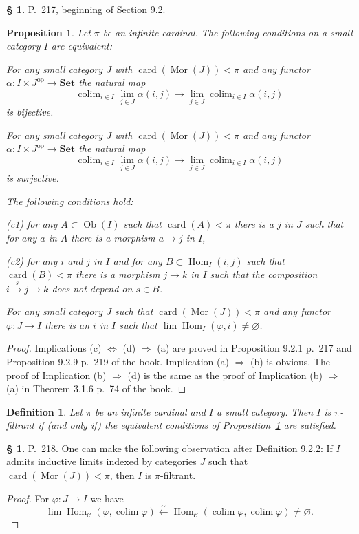 \documentclass[12pt]{article}%
\newtheorem{prop}[thm]{Proposition}
\newtheorem{df}[thm]{Definition}%
\theoremstyle{remark}
\theoremstyle{definition}
\newtheorem{s}[thm]{\S}%
\newcommand{\nn}{\noindent}
\newcommand{\C}{\mathcal C}
\newcommand{\Set}{\mathbf{Set}}%
\newcommand{\pp}{\varphi}
\newcommand{\ssi}{\Leftrightarrow}%
\newcommand{\then}{\Rightarrow}
\newcommand{\xr}{\xrightarrow}
\DeclareMathOperator*{\colim}{colim}%
\DeclareMathOperator{\card}{card}%
\DeclareMathOperator{\Hom}{Hom}%
\DeclareMathOperator{\Mor}{Mor}
\DeclareMathOperator{\Ob}{Ob}
\DeclareMathOperator{\op}{op}
\begin{document}
\begin{s}
P.~217, beginning of Section 9.2. 

\begin{prop}\label{ppifil}
Let $\pi$ be an infinite cardinal. The following conditions on a small category $I$ are equivalent:

\nn{\em(a)} For any small category $J$ with $\card(\Mor(J))<\pi$ and any functor $\alpha:I\times J^{\op}\to\Set$ the natural map 
$$
\colim_{i\in I}\lim_{j\in J}\alpha(i,j)\to\lim_{j\in J}\colim_{i\in I}\alpha(i,j)
$$ 
is bijective.

\nn{\em(b)} For any small category $J$ with $\card(\Mor(J))<\pi$ and any functor $\alpha:I\times J^{\op}\to\Set$ the natural map 
$$
\colim_{i\in I}\lim_{j\in J}\alpha(i,j)\to\lim_{j\in J}\colim_{i\in I}\alpha(i,j)
$$ 
is surjective.

\nn{\em(c)} The following conditions hold:

{\em(c1)} for any $A\subset\Ob(I)$ such that $\card(A)<\pi$ there is a $j$ in $J$ such that for any $a$ in $A$ there is a morphism $a\to j$ in $I$,

{\em(c2)} for any $i$ and $j$ in $I$ and for any $B\subset\Hom_I(i,j)$ such that $\card(B)<\pi$ there is a morphism $j\to k$ in $I$ such that the composition $i\xr sj\to k$ does not depend on $s\in B$.

\nn{\em(d)} For any small category $J$ such that $\card(\Mor(J))<\pi$ and any functor $\pp:J\to I$ there is an $i$ in $I$ such that $\lim\Hom_I(\pp,i)\neq\varnothing$. 
\end{prop}

\begin{proof}
Implications (c) $\ssi$ (d) $\then$ (a) are proved in Proposition 9.2.1 p.~217 and Proposition 9.2.9 p.~219 of the book. Implication (a) $\then$ (b) is obvious. The proof of Implication (b) $\then$ (d) is the same as the proof of Implication (b) $\then$ (a) in Theorem 3.1.6 p.~74 of the book.
\end{proof}

\begin{df}
Let $\pi$ be an infinite cardinal and $I$ a small category. Then $I$ is $\pi$-{\em filtrant} if (and only if) the equivalent conditions of Proposition~\ref{ppifil} are satisfied.
\end{df}
\end{s}

%

\begin{s}\label{922}
P.~218. One can make the following observation after Definition 9.2.2: If $I$ admits inductive limits indexed by categories $J$ such that $\card(\Mor(J))<\pi$, then $I$ is $\pi$-filtrant.

\begin{proof}
For $\pp:J\to I$ we have
$$
\lim\Hom_\C(\pp,\colim\pp)\xleftarrow\sim\Hom_\C(\colim\pp,\colim\pp)\neq\varnothing.
$$
\end{proof}
\end{s}
\end{document}
